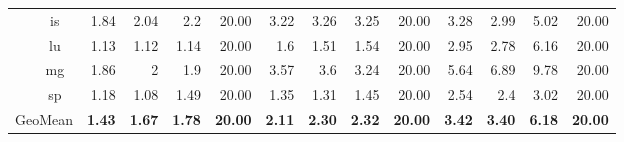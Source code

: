 \begin{tabular}{|c|c|rrrr|rrrr|rrrr|}
 & is & 1.84 & 2.04 & 2.2 & 20.00 & 3.22 & 3.26 & 3.25 & 20.00 & 3.28 & 2.99 & 5.02 & 20.00 \\
 & lu & 1.13 & 1.12 & 1.14 & 20.00 & 1.6 & 1.51 & 1.54 & 20.00 & 2.95 & 2.78 & 6.16 & 20.00 \\
 & mg & 1.86 & 2 & 1.9 & 20.00 & 3.57 & 3.6 & 3.24 & 20.00 & 5.64 & 6.89 & 9.78 & 20.00 \\
 & sp & 1.18 & 1.08 & 1.49 & 20.00 & 1.35 & 1.31 & 1.45 & 20.00 & 2.54 & 2.4 & 3.02 & 20.00 \\ \hline
\multicolumn{2}{|c|}{GeoMean} & \textbf{1.43} & \textbf{1.67} & \textbf{1.78} & \textbf{20.00} & \textbf{2.11} & \textbf{2.30} & \textbf{2.32} & \textbf{20.00} & \textbf{3.42} & \textbf{3.40} & \textbf{6.18} & \textbf{20.00} \\ \hline
\end{tabular}
